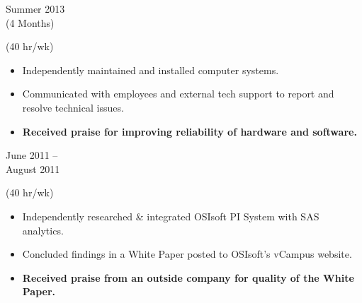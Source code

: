 
\flushleft \begin{minipage}[t]{\dateColWidth}
Summer 2013 \\
(4 Months)
\end{minipage}
\begin{minipage}[t]{0.8\textwidth}
 (40 hr/wk) \\[-1 em]
\begin{adjustwidth}{2.5 em}{0 em}

\begin{itemize} \itemsep-2pt
\setlength{\itemindent}{-2 em}

\item Independently maintained and installed computer systems.
\item Communicated with employees and external tech support to report and resolve technical issues.
\item\textbf{Received praise for improving reliability of hardware and software.}

\end{itemize}
\end{adjustwidth}
\end{minipage}

\divLine

\flushleft \begin{minipage}[t]{\dateColWidth}
June 2011 -- \\[0.2 em]
August 2011
\end{minipage}
\begin{minipage}[t]{0.8\textwidth}
 (40 hr/wk) \\[-1 em]
\begin{adjustwidth}{2.5 em}{0 em} 

\begin{itemize} \itemsep-2pt
\setlength{\itemindent}{-2 em}

\item Independently researched \& integrated OSIsoft PI System with SAS analytics.
\item Concluded findings in a White Paper posted to OSIsoft's vCampus website.
\item\textbf{Received praise from an outside company for quality of the White Paper.}
\end{itemize}

\end{adjustwidth}
\end{minipage}


